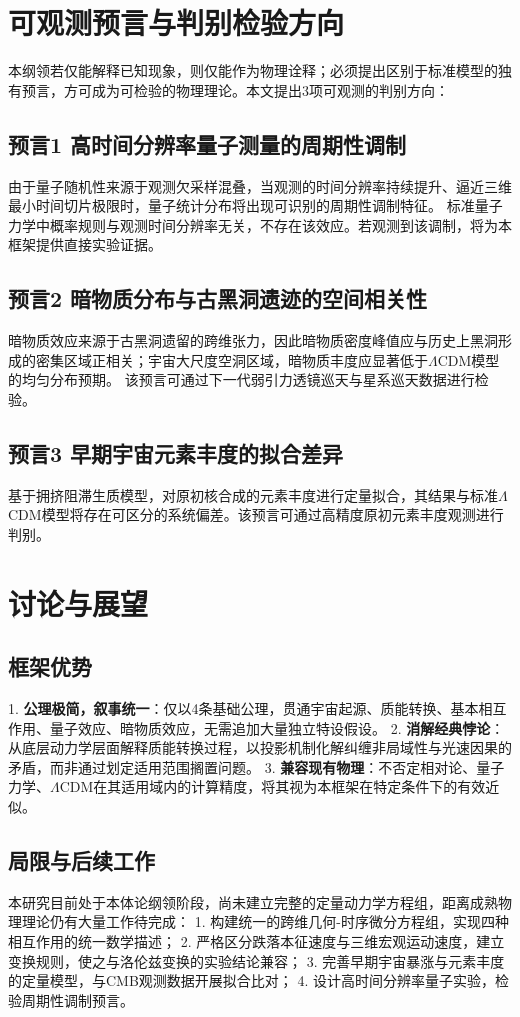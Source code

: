 \documentclass[12pt,a4paper]{ctexart}
\begin{document}
\section{可观测预言与判别检验方向}
本纲领若仅能解释已知现象，则仅能作为物理诠释；必须提出区别于标准模型的独有预言，方可成为可检验的物理理论。本文提出3项可观测的判别方向：

\subsection{预言1 高时间分辨率量子测量的周期性调制}
由于量子随机性来源于观测欠采样混叠，当观测的时间分辨率持续提升、逼近三维最小时间切片极限时，量子统计分布将出现可识别的周期性调制特征。
标准量子力学中概率规则与观测时间分辨率无关，不存在该效应。若观测到该调制，将为本框架提供直接实验证据。

\subsection{预言2 暗物质分布与古黑洞遗迹的空间相关性}
暗物质效应来源于古黑洞遗留的跨维张力，因此暗物质密度峰值应与历史上黑洞形成的密集区域正相关；宇宙大尺度空洞区域，暗物质丰度应显著低于$\Lambda$CDM模型的均匀分布预期。
该预言可通过下一代弱引力透镜巡天与星系巡天数据进行检验\cite{kaiser1992, des2021}。

\subsection{预言3 早期宇宙元素丰度的拟合差异}
基于拥挤阻滞生质模型，对原初核合成的元素丰度进行定量拟合，其结果与标准$\Lambda$CDM模型将存在可区分的系统偏差。该预言可通过高精度原初元素丰度观测进行判别\cite{burbidge1957, coc2015}。

\section{讨论与展望}
\subsection{框架优势}
1. \textbf{公理极简，叙事统一}：仅以4条基础公理，贯通宇宙起源、质能转换、基本相互作用、量子效应、暗物质效应，无需追加大量独立特设假设。
2. \textbf{消解经典悖论}：从底层动力学层面解释质能转换过程，以投影机制化解纠缠非局域性与光速因果的矛盾，而非通过划定适用范围搁置问题。
3. \textbf{兼容现有物理}：不否定相对论、量子力学、$\Lambda$CDM在其适用域内的计算精度，将其视为本框架在特定条件下的有效近似。

\subsection{局限与后续工作}
本研究目前处于本体论纲领阶段，尚未建立完整的定量动力学方程组，距离成熟物理理论仍有大量工作待完成：
1. 构建统一的跨维几何-时序微分方程组，实现四种相互作用的统一数学描述；
2. 严格区分跌落本征速度与三维宏观运动速度，建立变换规则，使之与洛伦兹变换的实验结论兼容；
3. 完善早期宇宙暴涨与元素丰度的定量模型，与CMB观测数据开展拟合比对；
4. 设计高时间分辨率量子实验，检验周期性调制预言。
\end{document}
